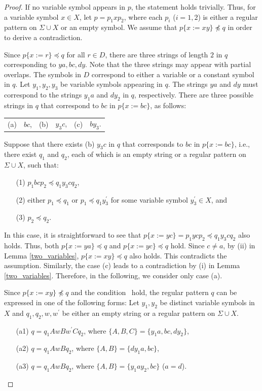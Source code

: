   \begin{proof}
  If no variable symbol appears in $p$, the statement holds trivially.
  Thus, for a variable symbol $x\in X$, let $p=p_{1}xp_{2}$, where each $p_{i}$ ($i=1,2$) is either a regular pattern on $\Sigma\cup X$ or an empty symbol.
  We assume that $p \{ x := xy \} \not \preceq q$ in order to derive a contradiction.

  Since $p \{ x := r \} \preceq q$ for all $r \in D$, there are three strings of length $2$ in $q$ corresponding to $ya, bc, dy$.
  Note that the three strings may appear with partial overlaps.
  The symbols in $D$ correspond to either a variable or a constant symbol in $q$.
  Let $y_{1}, y_{2}, y_{3}$ be variable symbols appearing in $q$.
  The strings $ya$ and $dy$ must correspond to the strings $y_{1}a$ and $dy_{2}$ in $q$, respectively.
  There are three possible strings in $q$ that correspond to $bc$ in $p\{x:=bc\}$, as follows:
  \begin{center}
    \begin{tabular}{cccccc}
      \textrm{(a)} & $bc$, & \textrm{(b)} & $y_{3}c$, & \textrm{(c)} & $by_{3}$.
    \end{tabular}
  \end{center}

  Suppose that there exists (b) $y_{3}c$ in $q$ that corresponds to $bc$ in $p\{x:=bc\}$, i.e., there exist $q_{1}$ and $q_{2}$, each of which is an empty string or a regular pattern on $\Sigma\cup X$, such that:
  \begin{enumerate}
  \item[(1)] $p_{1}bcp_{2} \preceq q_{1}y_{3}cq_{2}$, 
  \item[(2)] either $p_{1} \preceq q_{1}$ or $p_{1} \preceq q_{1}y_{3}^{\prime}$ for some variable symbol $y_{3}^{\prime}\in X$, and
  \item[(3)] $p_{2} \preceq q_{2}$.
  \end{enumerate}
  In this case, it is straightforward to see that $p\{x:=yc\} = p_{1}ycp_{2} \preceq q_{1}y_{3}cq_{2}$ also holds.
  Thus, both $p\{x:=ya\}\preceq q$ and $p\{x:=yc\}\preceq q$ hold. Since $c\not= a$, by (ii) in Lemma \ref{two_variables}, $p\{x:=xy\}\preceq q$ also holds. This contradicts the assumption.
  Similarly, the case (c) leads to a contradiction by (i) in Lemma \ref{two_variables}.
  Therefore, in the following, we consider only case (a).

  Since $p \{ x := xy \} \not \preceq q$ and the condition \TheConditionA\ hold, the regular pattern $q$ can be expressed in one of the following forms: Let $y_{1}, y_{2}$ be distinct variable symbols in $X$ and $q_{1}, q_{2}, w, w^{\prime}$ be either an empty string or a regular pattern on $\Sigma\cup X$.
  \begin{enumerate}
  \item[(a1)] $q=q_{1}AwBw^{\prime}Cq_{2}$, where $\{ A,B,C \} = \{ y_{1}a,bc,dy_{2} \}$,
  \item[(a2)] $q=q_{1}AwBq_{2}$, where $\{ A,B \} = \{ dy_{1}a,bc \}$,
  \item[(a3)] $q=q_{1}AwBq_{2}$, where $\{ A,B \} = \{ y_{1}ay_{2},bc \}$ ($a = d$).
  \end{enumerate}
  

\end{proof}
